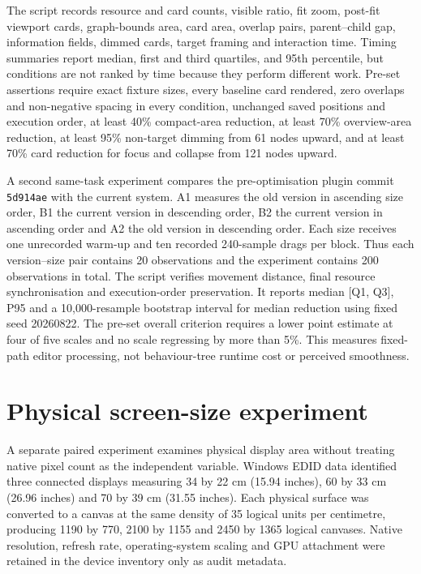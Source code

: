 The script records resource and card counts, visible ratio, fit zoom, post-fit viewport cards, graph-bounds area, card area, overlap pairs, parent--child gap, information fields, dimmed cards, target framing and interaction time. Timing summaries report median, first and third quartiles, and 95th percentile, but conditions are not ranked by time because they perform different work. Pre-set assertions require exact fixture sizes, every baseline card rendered, zero overlaps and non-negative spacing in every condition, unchanged saved positions and execution order, at least 40\% compact-area reduction, at least 70\% overview-area reduction, at least 95\% non-target dimming from 61 nodes upward, and at least 70\% card reduction for focus and collapse from 121 nodes upward.

A second same-task experiment compares the pre-optimisation plugin commit \texttt{5d914ae} with the current system. A1 measures the old version in ascending size order, B1 the current version in descending order, B2 the current version in ascending order and A2 the old version in descending order. Each size receives one unrecorded warm-up and ten recorded 240-sample drags per block. Thus each version--size pair contains 20 observations and the experiment contains 200 observations in total. The script verifies movement distance, final resource synchronisation and execution-order preservation. It reports median [Q1, Q3], P95 and a 10,000-resample bootstrap interval for median reduction using fixed seed 20260822. The pre-set overall criterion requires a lower point estimate at four of five scales and no scale regressing by more than 5\%. This measures fixed-path editor processing, not behaviour-tree runtime cost or perceived smoothness.

\section{Physical screen-size experiment}

A separate paired experiment examines physical display area without treating native pixel count as the independent variable. Windows EDID data identified three connected displays measuring 34 by 22 cm (15.94 inches), 60 by 33 cm (26.96 inches) and 70 by 39 cm (31.55 inches). Each physical surface was converted to a canvas at the same density of 35 logical units per centimetre, producing 1190 by 770, 2100 by 1155 and 2450 by 1365 logical canvases. Native resolution, refresh rate, operating-system scaling and GPU attachment were retained in the device inventory only as audit metadata.

